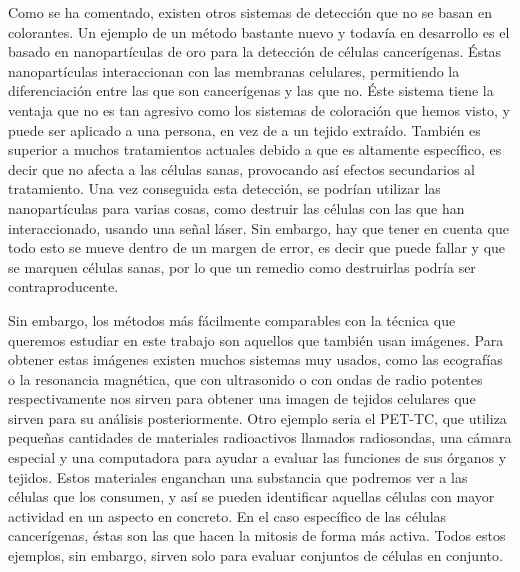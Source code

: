 \documentclass[a4paper, 12pt, UTF8]{article}
\begin{document}
Como se ha comentado, existen otros sistemas de detección que no se basan en colorantes. Un ejemplo de un método bastante nuevo y todavía en desarrollo es el basado en nanopartículas de oro para la detección de células cancerígenas. Éstas nanopartículas interaccionan con las membranas celulares, permitiendo la diferenciación entre las que son cancerígenas y las que no. Éste sistema tiene la ventaja que no es tan agresivo como los sistemas de coloración que hemos visto, y puede ser aplicado a una persona, en vez de a un tejido extraído. También es superior a muchos tratamientos actuales debido a que es altamente específico, es decir que no afecta a las células sanas, provocando así efectos secundarios al tratamiento. Una vez conseguida esta detección, se podrían utilizar las nanopartículas para varias cosas, como destruir las células con las que han interaccionado, usando una señal láser. Sin embargo, hay que tener en cuenta que todo esto se mueve dentro de un margen de error, es decir que puede fallar y que se marquen células sanas, por lo que un remedio como destruirlas podría ser contraproducente.

Sin embargo, los métodos más fácilmente comparables con la técnica que queremos estudiar en este trabajo son aquellos que también usan imágenes. Para obtener estas imágenes existen muchos sistemas muy usados, como las ecografías o la resonancia magnética, que con ultrasonido o con ondas de radio potentes respectivamente nos sirven para obtener una imagen de tejidos celulares que sirven para su análisis posteriormente. Otro ejemplo seria el PET-TC, que utiliza pequeñas cantidades de materiales radioactivos llamados radiosondas, una cámara especial y una computadora para ayudar a evaluar las funciones de sus órganos y tejidos. Estos materiales enganchan una substancia que podremos ver a las células que los consumen, y así se pueden identificar aquellas células con mayor actividad en un aspecto en concreto. En el caso específico de las células cancerígenas, éstas son las que hacen la mitosis de forma más activa. Todos estos ejemplos, sin embargo, sirven solo para evaluar conjuntos de células en conjunto.
\end{document}
